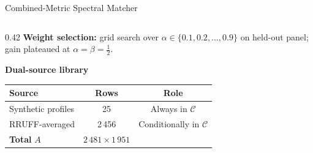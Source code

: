 \documentclass[aspectratio=169,10pt]{beamer}
\begin{document}
\begin{frame}{Combined-Metric Spectral Matcher}
\begin{columns}[T]
\begin{column}{0.42\textwidth}
      \vspace{0.14cm}
      \textbf{Weight selection:} grid search over
      $\alpha\in\{0.1,0.2,\ldots,0.9\}$ on held-out panel;
      gain plateaued at $\alpha{=}\beta{=}\tfrac{1}{2}$.

      \vspace{0.14cm}
      \textbf{Dual-source library}

      \vspace{0.04cm}
      \scriptsize
      \begin{tabular}{@{}lcc@{}}
        \toprule
        \textbf{Source} & \textbf{Rows} & \textbf{Role}\\
        \midrule
        Synthetic profiles & 25 & Always in $\mathcal{C}$\\
        RRUFF-averaged & 2\,456 & Conditionally in $\mathcal{C}$\\
        \midrule
        \textbf{Total} $A$ & $2\,481\times1\,951$ &\\
        \bottomrule
      \end{tabular}
    \end{column}
  \end{columns}
\end{frame}
\end{document}
